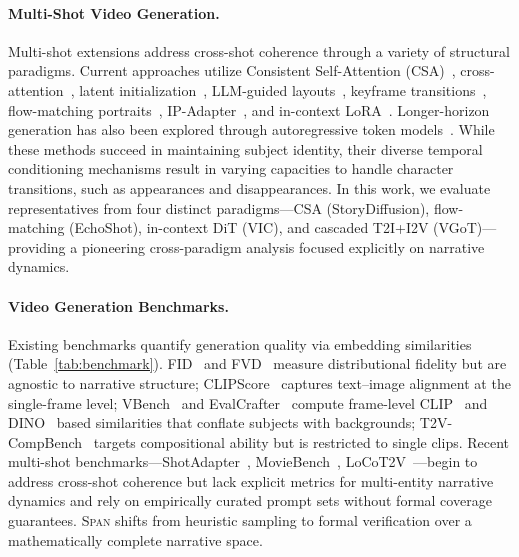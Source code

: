 \documentclass[sigconf,review,anonymous]{acmart}
\theoremstyle{definition}
\newcommand{\diagonal}{\textsc{Span}}
\begin{document}
\paragraph{Multi-Shot Video Generation.}
Multi-shot extensions address cross-shot coherence through a variety of structural paradigms. Current approaches utilize Consistent Self-Attention (CSA)~\cite{storydiff,consistory}, cross-attention~\cite{videostudio}, latent initialization~\cite{mevg}, LLM-guided layouts~\cite{vgot,videodirectorgpt,storygen}, keyframe transitions~\cite{seine,dynamicrafter}, flow-matching portraits~\cite{echoshot}, IP-Adapter~\cite{ip_adapter}, and in-context LoRA~\cite{vic,lora}. Longer-horizon generation has also been explored through autoregressive token models~\cite{videopoet,phenaki}. While these methods succeed in maintaining subject identity, their diverse temporal conditioning mechanisms result in varying capacities to handle character transitions, such as appearances and disappearances. In this work, we evaluate representatives from four distinct paradigms---CSA (StoryDiffusion), flow-matching (EchoShot), in-context DiT (VIC), and cascaded T2I+I2V (VGoT)---providing a pioneering cross-paradigm analysis focused explicitly on narrative dynamics.

\paragraph{Video Generation Benchmarks.}
Existing benchmarks quantify generation quality via embedding similarities (Table~\ref{tab:benchmark}). FID~\cite{fid} and FVD~\cite{fvd} measure distributional fidelity but are agnostic to narrative structure; CLIPScore~\cite{clipscore} captures text--image alignment at the single-frame level; VBench~\cite{vbench,vbench2} and EvalCrafter~\cite{evalcrafter} compute frame-level CLIP~\cite{clip} and DINO~\cite{dinov2} based similarities that conflate subjects with backgrounds; T2V-CompBench~\cite{t2vcompbench} targets compositional ability but is restricted to single clips.
Recent multi-shot benchmarks---ShotAdapter~\cite{shotadapter}, MovieBench~\cite{moviebench}, LoCoT2V~\cite{locot2v}---begin to address cross-shot coherence but lack explicit metrics for multi-entity narrative dynamics and rely on empirically curated prompt sets without formal coverage guarantees. \diagonal{} shifts from heuristic sampling to formal verification over a mathematically complete narrative space.
\end{document}
